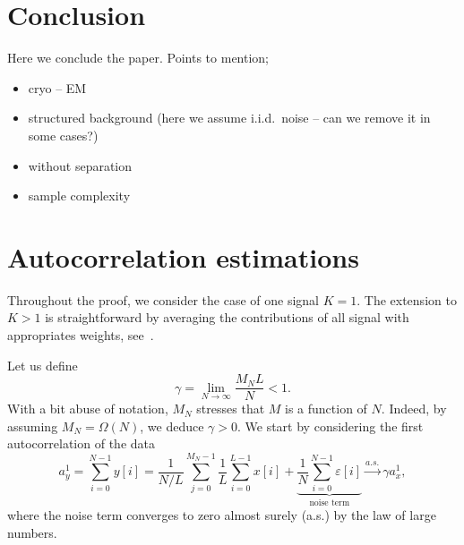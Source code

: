 \documentclass[english,11pt]{article}
\numberwithin{equation}{section}
\theoremstyle{plain}
\theoremstyle{definition}
\theoremstyle{remark}
\theoremstyle{plain}
\theoremstyle{remark}
\theoremstyle{plain}
\theoremstyle{plain}
\begin{document}
\section{Conclusion} 
Here we conclude the paper. Points to mention;
\begin{itemize}
\item cryo -- EM
\item  structured background (here we assume i.i.d.\ noise -- can we remove it in some cases?)
\item   without separation   	
\item  sample complexity
\end{itemize}
	







\appendix

\section{Autocorrelation estimations} \label{sec:autocorrelation_computation}

Throughout the proof, we consider the case of one signal $K=1$. The extension to $K>1$ is straightforward by averaging the contributions of all signal with  appropriates weights, see~\cite{boumal2017heterogeneous}. 

Let us define
\begin{equation}
\gamma = \lim_{N\to\infty} \frac{M_NL}{N}<1.
\end{equation}
With a bit abuse of notation, $M_N$ stresses that $M$ is a function of $N$. Indeed, by assuming $M_N=\Omega(N)$, we deduce $\gamma>0$.
We start by considering the first autocorrelation of the data
\begin{equation}
a_y^1 = \sum_{i=0}^{N-1} y[i] = \frac{1}{N/L}\sum_{j=0}^{M_N-1}\frac{1}{L}\sum_{i=0}^{L-1}x[i] + \underbrace{\frac{1}{N}\sum_{i=0}^{N-1}\varepsilon[i]}_{\text{noise term}} \xrightarrow{a.s.}\gamma a_x^1,
\end{equation}
where the noise term converges to zero almost surely (a.s.) by the law of large numbers.
\end{document}
